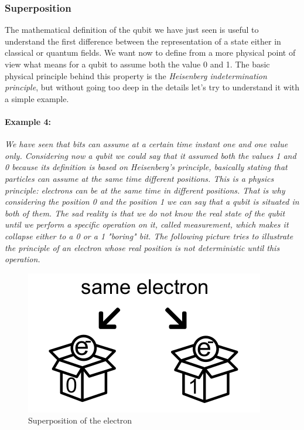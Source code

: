 \documentclass[english]{article}
\begin{document}
			\subsubsection{Superposition}
			\label{sec:superposition}
				The mathematical definition of the qubit we have just seen is useful to understand the first difference between the representation of a state either in classical or quantum fields. We want now to define from a more physical point of view what means for a qubit to assume both the value 0 and 1. The basic physical principle behind this property is the \emph{Heisenberg indetermination principle}, but without going too deep in the details let's try to understand it with a simple example. 
				
				\paragraph{Example 4:} \emph{We have seen that bits can assume at a certain time instant one and one value only. Considering now a qubit we could say that it assumed both the values 1 and 0 because its definition is based on Heisenberg's principle, basically stating that particles can assume at the same time different positions. This is a physics principle: electrons can be at the same time in different positions. That is why considering the position 0 and the position 1 we can say that a qubit is situated in both of them. The sad reality is that we do not know the real state of the qubit until we perform a specific operation on it, called measurement, which makes it collapse either to a 0 or a 1 "boring" bit. The following picture tries to illustrate the principle of an electron whose real position is not deterministic until this operation.}
				
				\begin{figure}[h]
					\centering
					\includegraphics[scale=0.75]{superposition.png}
					\caption{Superposition of the electron}
				\end{figure}
			
\end{document}
